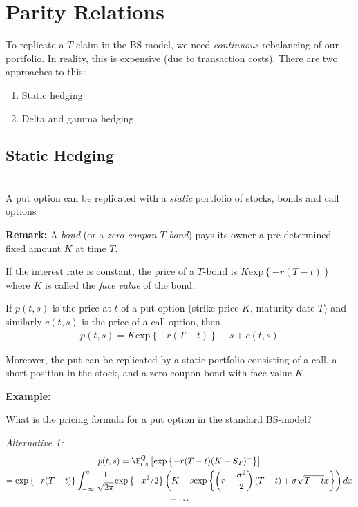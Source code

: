 \section{Parity Relations}
To replicate a $T$-claim in the BS-model, we need \textit{continuous} rebalancing of our portfolio. In reality, this is expensive (due to transaction costs). There are two approaches to this:\par
\begin{enumerate}[leftmargin=*]
  \item Static hedging
  \item Delta and gamma hedging
\end{enumerate}
\par\bigskip
\subsection{Static Hedging}\hfill\\
A put option can be replicated with a \textit{static} portfolio of stocks, bonds and call options
\par\bigskip
\noindent\textbf{Remark:} A \textit{bond} (or a \textit{zero-coupan $T$-bond}) pays its owner a pre-determined fixed amount $K$ at time $T$.\par
\noindent If the interest rate is constant, the price of a $T$-bond is $K\text{exp}\left\{-r(T-t)\right\}$ where $K$ is called the \textit{face value} of the bond.
\par\bigskip
\begin{lem}{}
  If $p(t,s)$ is the price at $t$ of a put option (strike price $K$, maturity date $T$) and similarly $c(t,s)$ is the price of a call option, then
  \begin{equation*}
    \begin{gathered}
      p(t,s) = K\text{exp}\left\{-r(T-t)\right\}-s+c(t,s)
    \end{gathered}
  \end{equation*}\par
  \noindent Moreover, the put can be replicated by a static portfolio consisting of a call, a short position in the stock, and a zero-coupon bond with face value $K$
\end{lem}
\par\bigskip
\noindent\textbf{Example:}\par
\noindent What is the pricing formula for a put option in the standard BS-model?\par
\noindent\textit{Alternative 1:}
\begin{equation*}
  \begin{gathered}
    p(t,s) = \E_{t,s}^Q\left[\text{exp}\left\{-r(T-t)(K-S_T)^+\right\}\right]\\
    = \text{exp}\left\{-r(T-t)\right\}\int_{-\infty}^{a}\dfrac{1}{\sqrt{2\pi}}\text{exp}\left\{-x^2/2\right\}\left(K-s\text{exp}\left\{\left(r-\dfrac{\sigma^2}{2}\right)(T-t)+\sigma\sqrt{T-t}x\right\}\right)dx\\
    = \cdots
  \end{gathered}
\end{equation*}
